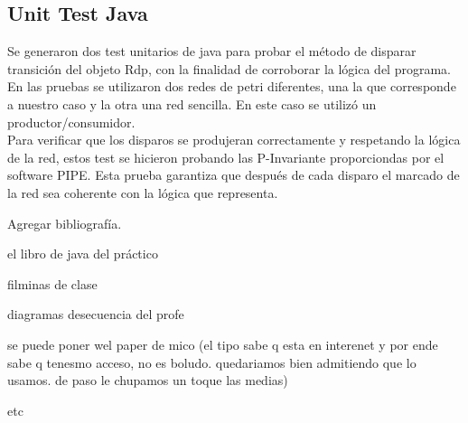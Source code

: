 \documentclass[10pt, a4paper,notitlepage]{article}
\begin{document}
\subsection{Unit Test Java}
Se generaron dos test unitarios de java para probar el método de disparar transición del objeto Rdp, con la finalidad de corroborar la lógica del programa. En las pruebas se utilizaron dos redes de petri diferentes, una la que corresponde a nuestro caso y la otra una red sencilla. En este caso se utilizó un productor/consumidor.\\
Para verificar que los disparos se produjeran correctamente y respetando la lógica de la red, estos test se hicieron probando las P-Invariante proporciondas por el software PIPE. Esta prueba garantiza que después de cada disparo el marcado de la red sea coherente con la lógica que representa.

\begin{thebibliography}{100} %

Agregar bibliografía.

el libro de java del práctico

filminas de clase

diagramas desecuencia del profe

se puede poner wel paper de mico (el tipo sabe q esta en interenet y por ende sabe q tenesmo acceso, no es boludo. quedariamos bien admitiendo que lo usamos. de paso le chupamos un toque las medias)

etc


\end{thebibliography}
\end{document}
